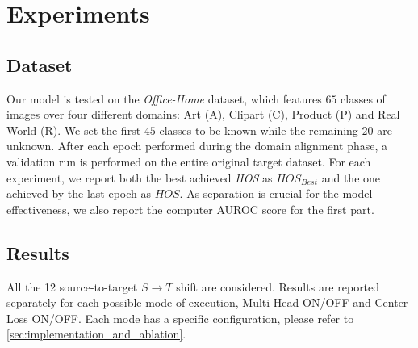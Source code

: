 \documentclass[10pt,twocolumn,letterpaper]{article}
\begin{document}
\section{Experiments}
\label{sec:experiments}

\subsection{Dataset}
\label{sec:dataset}

Our model is tested on the {\it Office-Home} dataset\cite{OfficeHomeDataset}, which features $65$ classes of images over four different domains: Art (A), Clipart (C), Product (P) and Real World (R).
We set the first $45$ classes to be known while the remaining $20$ are unknown.
After each epoch performed during the domain alignment phase, a validation run is performed on the entire original target dataset.
For each experiment, we report both the best achieved {\it HOS} as $HOS_{Best}$ and the one achieved by the last epoch as $HOS$.
As separation is crucial for the model effectiveness, we also report the computer AUROC score for the first part.

\subsection{Results}
\label{sec:results}
All the 12 source-to-target $S\to T$ shift are considered.
Results are reported separately for each possible mode of execution, Multi-Head ON/OFF and Center-Loss ON/OFF.
Each mode has a specific configuration, please refer to \ref{sec:implementation_and_ablation}.
\end{document}
